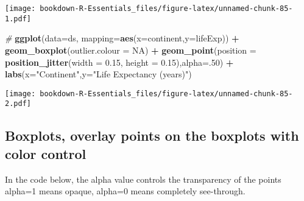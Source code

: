 \documentclass[
]{book}
\newenvironment{Shaded}{\begin{snugshade}}{\end{snugshade}}
\newcommand{\CommentTok}[1]{\textcolor[rgb]{0.56,0.35,0.01}{\textit{#1}}}
\newcommand{\DataTypeTok}[1]{\textcolor[rgb]{0.13,0.29,0.53}{#1}}
\newcommand{\DecValTok}[1]{\textcolor[rgb]{0.00,0.00,0.81}{#1}}
\newcommand{\FloatTok}[1]{\textcolor[rgb]{0.00,0.00,0.81}{#1}}
\newcommand{\KeywordTok}[1]{\textcolor[rgb]{0.13,0.29,0.53}{\textbf{#1}}}
\newcommand{\NormalTok}[1]{#1}
\newcommand{\OperatorTok}[1]{\textcolor[rgb]{0.81,0.36,0.00}{\textbf{#1}}}
\newcommand{\OtherTok}[1]{\textcolor[rgb]{0.56,0.35,0.01}{#1}}
\newcommand{\StringTok}[1]{\textcolor[rgb]{0.31,0.60,0.02}{#1}}
\begin{document}
\texttt{[image: bookdown-R-Essentials\_files/figure-latex/unnamed-chunk-85-1.pdf]}

\begin{Shaded}
\begin{Highlighting}[]
\CommentTok{#}
\KeywordTok{ggplot}\NormalTok{(}\DataTypeTok{data=}\NormalTok{ds, }\DataTypeTok{mapping=}\KeywordTok{aes}\NormalTok{(}\DataTypeTok{x=}\NormalTok{continent,}\DataTypeTok{y=}\NormalTok{lifeExp)) }\OperatorTok{+}\StringTok{  }
\StringTok{ }\KeywordTok{geom_boxplot}\NormalTok{(}\DataTypeTok{outlier.colour =} \OtherTok{NA}\NormalTok{) }\OperatorTok{+}\StringTok{ }
\StringTok{ }\KeywordTok{geom_point}\NormalTok{(}\DataTypeTok{position =} \KeywordTok{position_jitter}\NormalTok{(}\DataTypeTok{width =} \FloatTok{0.15}\NormalTok{, }\DataTypeTok{height =} \FloatTok{0.15}\NormalTok{),}\DataTypeTok{alpha=}\NormalTok{.}\DecValTok{50}\NormalTok{) }\OperatorTok{+}
\StringTok{  }\KeywordTok{labs}\NormalTok{(}\DataTypeTok{x=}\StringTok{"Continent"}\NormalTok{,}\DataTypeTok{y=}\StringTok{"Life Expectancy (years)"}\NormalTok{)}
\end{Highlighting}
\end{Shaded}

\texttt{[image: bookdown-R-Essentials\_files/figure-latex/unnamed-chunk-85-2.pdf]}

\hypertarget{boxplots-overlay-points-on-the-boxplots-with-color-control}{%
\subsection{Boxplots, overlay points on the boxplots with color control}\label{boxplots-overlay-points-on-the-boxplots-with-color-control}}

In the code below, the alpha value controls the transparency of the points alpha=1 means opaque, alpha=0 means completely see-through.
\end{document}
